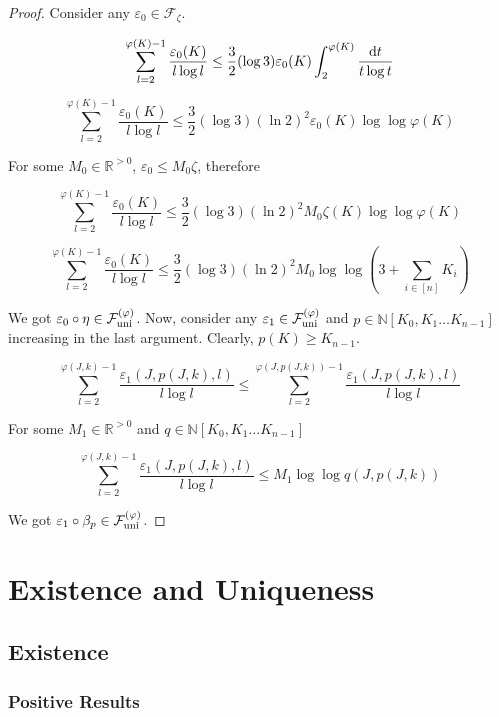 \documentclass[11pt]{article}
\numberwithin{equation}{section}
\theoremstyle{definition}
\theoremstyle{plain}
\newcommand{\Nats}{\mathbb{N}}
\newcommand{\Reals}{\mathbb{R}}
\newcommand{\NatPoly}{\Nats[K_0, K_1 \ldots K_{n-1}]}
\newcommand{\Fall}{\mathcal{F}}
\newcommand{\FallUt}[1]{{\Fall_{\textnormal{uni}}^{(#1)}}}
\begin{document}
\begin{proof}

Consider any ${\varepsilon_0 \in \Fall_\zeta}$.

\[\sum_{l=2}^{\varphi(K)-1} \frac{\varepsilon_0(K)}{l \log l} \leq \frac{3}{2} (\log 3) \varepsilon_0(K) \int_2^{\varphi(K)} \frac{\dif t}{t \log t}\]

\[\sum_{l=2}^{\varphi(K)-1} \frac{\varepsilon_0(K)}{l \log l} \leq \frac{3}{2} (\log 3) (\ln 2)^2 \varepsilon_0(K) \log \log \varphi(K)\]

For some ${M_0 \in \Reals^{>0}}$, ${\varepsilon_0 \leq M_0 \zeta}$, therefore

\[\sum_{l=2}^{\varphi(K)-1} \frac{\varepsilon_0(K)}{l \log l} \leq \frac{3}{2} (\log 3)(\ln 2)^2 M_0 \zeta(K) \log \log \varphi(K)\]

\[\sum_{l=2}^{\varphi(K)-1} \frac{\varepsilon_0(K)}{l \log l} \leq \frac{3}{2} (\log 3)(\ln 2)^2 M_0 \log \log (3+\sum_{i \in [n]} K_i)\]

We got ${\varepsilon_0 \circ \eta \in \FallUt{\varphi}}$. Now, consider any ${\varepsilon_1 \in \FallUt{\varphi}}$ and ${p \in \NatPoly}$ increasing in the last argument. Clearly, ${p(K) \geq K_{n-1}}$.

\[\sum_{l=2}^{\varphi(J,k)-1} \frac{\varepsilon_1(J,p(J,k),l)}{l \log l} \leq \sum_{l=2}^{\varphi(J,p(J,k))-1} \frac{\varepsilon_1(J,p(J,k),l)}{l \log l}\]

For some ${M_1 \in \Reals^{>0}}$ and ${q \in \NatPoly}$

\[\sum_{l=2}^{\varphi(J,k)-1} \frac{\varepsilon_1(J,p(J,k),l)}{l \log l} \leq M_1 \log \log q(J,p(J,k))\]

We got ${\varepsilon_1 \circ \beta_p \in \FallUt{\varphi}}$.
%
\end{proof}

\section{Existence and Uniqueness}
\label{sec:e_and_u}

\subsection{Existence}

\subsubsection{Positive Results}
\end{document}

